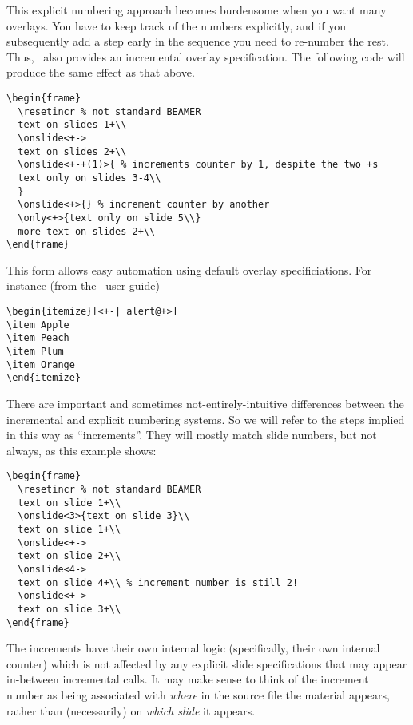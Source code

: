 \documentclass[a4paper]{ltxdoc}
\begin{document}
This explicit numbering approach becomes burdensome when you want many overlays.
You have to keep track of the numbers explicitly, and if you subsequently add a
step early in the sequence you need to re-number the rest.  Thus, \beamer\ also
provides an incremental overlay specification.  The following code will produce
the same effect as that above.  \example
\begin{verbatim}
\begin{frame}
  \resetincr % not standard BEAMER
  text on slides 1+\\
  \onslide<+->
  text on slides 2+\\
  \onslide<+-+(1)>{ % increments counter by 1, despite the two +s
  text only on slides 3-4\\
  } 
  \onslide<+>{} % increment counter by another
  \only<+>{text only on slide 5\\}
  more text on slides 2+\\
\end{frame}
\end{verbatim}
This form allows easy automation using default overlay
specificiations.  For instance (from the \beamer\ user guide)
\example
\begin{verbatim}
\begin{itemize}[<+-| alert@+>]
\item Apple
\item Peach
\item Plum
\item Orange
\end{itemize}
\end{verbatim}
There are important and sometimes not-entirely-intuitive differences between the
incremental and explicit numbering systems.  So we will refer to the steps
implied in this way as ``increments''.  They will mostly match slide numbers,
but not always, as this example shows: \example
\begin{verbatim}
\begin{frame}
  \resetincr % not standard BEAMER
  text on slide 1+\\
  \onslide<3>{text on slide 3}\\
  text on slide 1+\\
  \onslide<+->
  text on slide 2+\\
  \onslide<4->
  text on slide 4+\\ % increment number is still 2!
  \onslide<+->
  text on slide 3+\\
\end{frame}
\end{verbatim}
The increments have their own internal logic (specifically, their own internal
counter) which is not affected by any explicit slide specifications that may
appear in-between incremental calls.  It may make sense to think of the
increment number as being associated with \emph{where} in the source file the
material appears, rather than (necessarily) on \emph{which slide} it appears.
\end{document}

